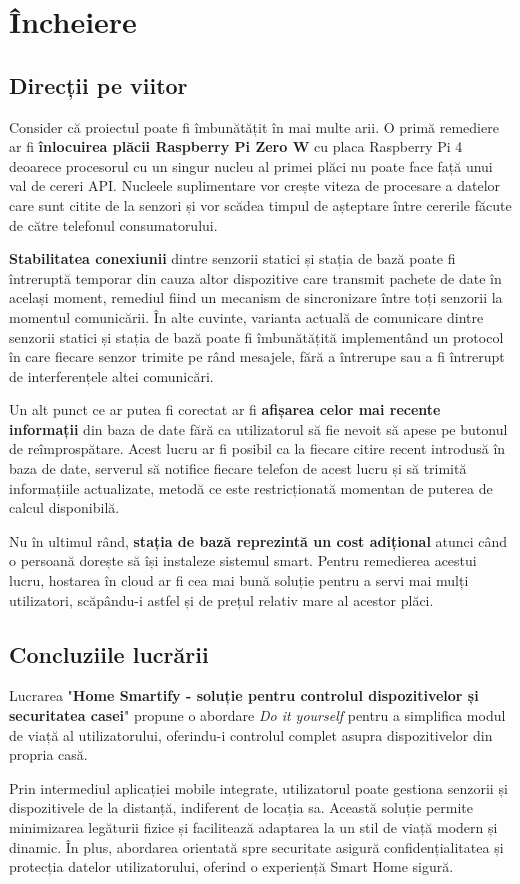 \chapter*{Încheiere} 

\section*{Direcții pe viitor}

Consider că proiectul poate fi îmbunătățit în mai multe arii. O primă remediere ar fi \textbf{înlocuirea plăcii Raspberry Pi Zero W} cu placa Raspberry Pi 4 deoarece procesorul cu un singur nucleu al primei plăci nu poate face față unui val de cereri API. Nucleele suplimentare vor crește viteza de procesare a datelor care sunt citite de la senzori și vor scădea timpul de așteptare între cererile făcute de către telefonul consumatorului.

\textbf{Stabilitatea conexiunii} dintre senzorii statici și stația de bază poate fi întreruptă temporar din cauza altor dispozitive care transmit pachete de date în același moment, remediul fiind un mecanism de sincronizare între toți senzorii la momentul comunicării. În alte cuvinte, varianta actuală de comunicare dintre senzorii statici și stația de bază poate fi îmbunătățită implementând un protocol în care fiecare senzor trimite pe rând mesajele, fără a întrerupe sau a fi întrerupt de interferențele altei comunicări.

Un alt punct ce ar putea fi corectat ar fi \textbf{afișarea celor mai recente informații} din baza de date fără ca utilizatorul să fie nevoit să apese pe butonul de reîmprospătare. Acest lucru ar fi posibil ca la fiecare citire recent introdusă în baza de date, serverul să notifice fiecare telefon de acest lucru și să trimită informațiile actualizate, metodă ce este restricționată momentan de puterea de calcul disponibilă.

Nu în ultimul rând, \textbf{stația de bază reprezintă un cost adițional} atunci când o persoană dorește să își instaleze sistemul smart. Pentru remedierea acestui lucru, hostarea în cloud ar fi cea mai bună soluție pentru a servi mai mulți utilizatori, scăpându-i astfel și de prețul relativ mare al acestor plăci.

\section*{Concluziile lucrării}

Lucrarea "\textbf{Home Smartify - soluție pentru controlul dispozitivelor și securitatea casei}" propune o abordare \emph{Do it yourself} pentru a simplifica modul de viață al utilizatorului, oferindu-i controlul complet asupra dispozitivelor din propria casă. 

Prin intermediul aplicației mobile integrate, utilizatorul poate gestiona senzorii și dispozitivele de la distanță, indiferent de locația sa. Această soluție permite minimizarea legăturii fizice și facilitează adaptarea la un stil de viață modern și dinamic. În plus, abordarea orientată spre securitate asigură confidențialitatea și protecția datelor utilizatorului, oferind o experiență Smart Home sigură.